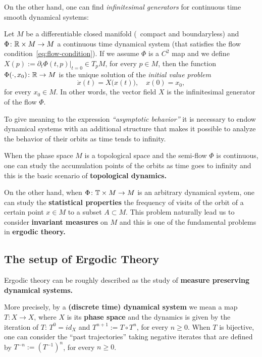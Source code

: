 On the other hand, one can find \emph{infinitesimal generators} for continuous time smooth dynamical systems:

\begin{exercise}
  Let $M$ be a differentiable closed manifold (\ie~compact and boundaryless) and $\Phi\colon\mathbb{R}\times M\to M$ a continuous time dynamical system (that satisfies the flow condition~\ref{eq:flow-condition}). If  we assume $\Phi$ is a $C^{2}$ map and we define $X(p):=\partial_{t}\Phi(t,p)\big|_{t=0}\in T_{p}M$, for every $p\in M$, then the function $\Phi(\cdot,x_{0})\colon\mathbb{R}\to M$ is the unique solution of the \emph{initial value problem}
  \begin{displaymath}
    \dot x(t)=X\big(x(t)\big), \quad x(0)=x_{0},
  \end{displaymath}
  for every $x_{0}\in M$. In other words, the vector field $X$ is the infinitesimal generator of the flow $\Phi$.
\end{exercise}

To give meaning to the expression \emph{``asymptotic behavior''} it is necessary to endow dynamical systems with an additional structure that makes it possible to analyze the behavior of their orbits as time tends to infinity.

When the phase space $M$ is a topological space and the semi-flow $\Phi$ is continuous, one can study the accumulation points of the orbits as time goes to infinity and this is the basic scenario of \textbf{topological dynamics.}

On the other hand, when $\Phi\colon\mathbb{T}\times M\to M$ is an arbitrary dynamical system, one can study the \textbf{statistical properties} the frequency of visits of the orbit of a certain point $x\in M$ to a subset $A\subset M$. This problem naturally lead us to consider \textbf{invariant measures} on $M$ and this is one of the fundamental problems in \textbf{ergodic theory.}

\subsection{The setup of Ergodic Theory}\label{sec:setup-ergodic-theory}

Ergodic theory can be roughly described as the study of \textbf{measure preserving dynamical systems.}

More precisely, by a \textbf{(discrete time) dynamical system} we mean a map $T\colon X\to X$, where $X$ is its \textbf{phase space} and the dynamics is given by the iteration of $T$: $T^{0}=id_{X}$ and $T^{n+1}:= T\circ T^{n}$, for every $n\geq 0$. When $T$ is bijective, one can consider the ``past trajectories'' taking negative iterates that are defined by $T^{-n}:={(T^{-1})}^{n}$, for every $n\geq 0$.

